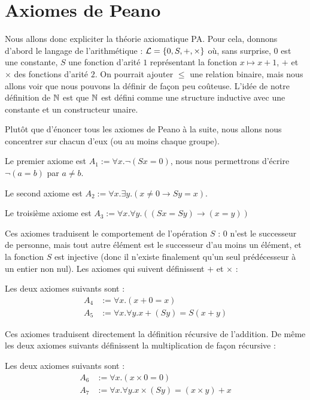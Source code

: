\section{Axiomes de Peano}

Nous allons donc expliciter la théorie axiomatique PA. Pour cela, donnons d'abord le langage de l'arithmétique : $\mathcal L=\{0,S,+,\times\}$ où, sans surprise, $0$ est une constante, $S$ une fonction d'arité $1$ représentant la fonction $x\mapsto x+1$, $+$ et $\times$ des fonctions d'arité $2$. On pourrait ajouter $\leq$ une relation binaire, mais nous allons voir que nous pouvons la définir de façon peu coûteuse. L'idée de notre définition de $\mathbb{N}$ est que $\mathbb{N}$ est défini comme une structure inductive avec une constante et un constructeur unaire.

Plutôt que d'énoncer tous les axiomes de Peano à la suite, nous allons nous concentrer sur chacun d'eux (ou au moins chaque groupe). 

\begin{defi}
    Le premier axiome est $A_1 := \forall x. \lnot (S x = 0)$, nous nous permettrons d'écrire $\lnot (a=b)$ par $a\neq b$.

    Le second axiome est $A_2 := \forall x. \exists y.(x\neq 0 \to S y = x)$.

    Le troisième axiome est $A_3 := \forall x.\forall y. ((S x = S y)\to (x=y))$
\end{defi}

Ces axiomes traduisent le comportement de l'opération $S$ : $0$ n'est le successeur de personne, mais tout autre élément est le successeur d'au moins un élément, et la fonction $S$ est injective (donc il n'existe finalement qu'un seul prédécesseur à un entier non nul). Les axiomes qui suivent définissent $+$ et $\times$ :

\begin{defi}
    Les deux axiomes suivants sont :
    \begin{align*}
        A_4 &:= \forall x. (x+0=x)\\
        A_5 &:= \forall x. \forall y. x + (S y) = S (x + y)
    \end{align*}
\end{defi}

Ces axiomes traduisent directement la définition récursive de l'addition. De même les deux axiomes suivants définissent la multiplication de façon récursive :

\begin{defi}
    Les deux axiomes suivants sont :
    \begin{align*}
        A_6 &:= \forall x. (x\times 0 = 0)\\
        A_7 &:= \forall x.\forall y. x\times (S y) = (x\times y) + x
    \end{align*}
\end{defi}

